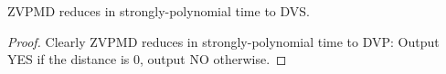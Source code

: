 
\begin{lemma}
ZVPMD reduces in strongly-polynomial time to DVS.
\end{lemma}
\begin{proof}
Clearly ZVPMD reduces in strongly-polynomial time to DVP: Output YES if the distance is 0, output NO otherwise.



\end{proof}
